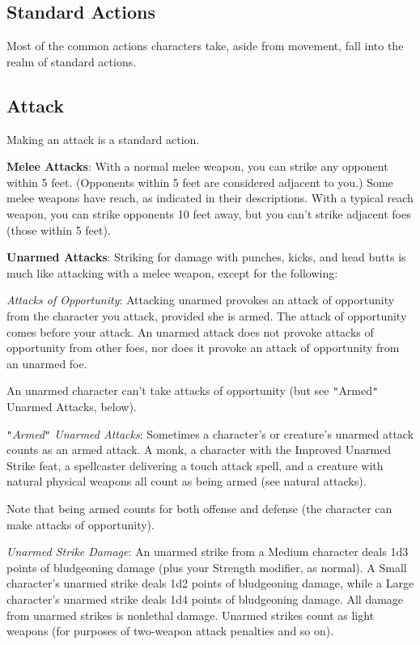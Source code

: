 \subsection{Standard Actions}

				
Most of the common actions characters take, aside from movement, fall into the realm of standard actions.
				
\subsection{Attack}

				
Making an attack is a standard action.
				
\textbf{Melee Attacks}: With a normal melee weapon, you can strike any opponent within 5 feet. (Opponents within 5 feet are considered adjacent to you.) Some melee weapons have reach, as indicated in their descriptions. With a typical reach weapon, you can strike opponents 10 feet away, but you can't strike adjacent foes (those within 5 feet).
				
\textbf{Unarmed Attacks}: Striking for damage with punches, kicks, and head butts is much like attacking with a melee weapon, except for the following:
				
\textit{Attacks of Opportunity}: Attacking unarmed provokes an attack of opportunity from the character you attack, provided she is armed. The attack of opportunity comes before your attack. An unarmed attack does not provoke attacks of opportunity from other foes, nor does it provoke an attack of opportunity from an unarmed foe.
				
An unarmed character can't take attacks of opportunity (but see \texttt{{}"{}}Armed\texttt{{}"{}} Unarmed Attacks, below).
				
\textit{\texttt{{}"{}}Armed\texttt{{}"{}} Unarmed Attacks}: Sometimes a character's or creature's unarmed attack counts as an armed attack. A monk, a character with the Improved Unarmed Strike feat, a spellcaster delivering a touch attack spell, and a creature with natural physical weapons all count as being armed (see natural attacks).
				
Note that being armed counts for both offense and defense (the character can make attacks of opportunity).
				
\textit{Unarmed Strike Damage}: An unarmed strike from a Medium character deals 1d3 points of bludgeoning damage (plus your Strength modifier, as normal). A Small character's unarmed strike deals 1d2 points of bludgeoning damage, while a Large character's unarmed strike deals 1d4 points of bludgeoning damage. All damage from unarmed strikes is nonlethal damage. Unarmed strikes count as light weapons (for purposes of two-weapon attack penalties and so on).
				
